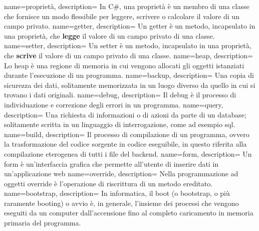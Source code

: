 {
    name=proprietà,
    description={
        In C\#, una proprietà è un membro di una classe che fornisce un modo flessibile per leggere, scrivere o calcolare il valore di un campo privato.
        }
}
{
    name=getter,
    description={
        Un getter è un metodo, incapsulato in una proprietà, che \textbf{legge} il valore di un campo privato di una classe.
        }
}
{
    name=setter,
    description={
        Un setter è un metodo, incapsulato in una proprietà, che \textbf{scrive} il valore di un campo privato di una classe.
        }
}
{
    name=heap,
    description={
        Lo heap è una regione di memoria in cui vengono allocati gli oggetti istanziati durante l'esecuzione di un programma.
        }
}
{
    name=backup,
    description={
        Una copia di sicurezza dei dati, solitamente memorizzata in un luogo diverso da quello in cui si trovano i dati originali.
        }
}
{
    name=debug,
    description={
        Il debug è il processo di individuazione e correzione degli errori in un programma.
        }
}
{
    name=query,
    description={
        Una richiesta di informazioni o di azioni da parte di un database; solitamente scritta in un linguaggio di interrogazione, come ad esempio \acrshort{sql}.
        }
}
{
    name=build,
    description={
        Il processo di compilazione di un programma, ovvero la trasformazione del codice sorgente in codice eseguibile, in questo riferita alla compilazione eterogenea di tutti i file del backend.
        }
}
{
    name=form,
    description={
        Un form è un'interfaccia grafica che permette all'utente di inserire dati in un'applicazione web
        }
}
{
    name=override,
    description={
        Nella programmazione ad oggetti override è l'operazione di riscrittura di un metodo ereditato.
        }
}
{
    name=bootstrap,
    description={
        In informatica, il boot (o bootstrap, o più raramente booting) o avvio è, in generale, l'insieme dei processi che vengono eseguiti da un computer dall'accensione fino al completo caricamento in memoria primaria del programma.
    }
}